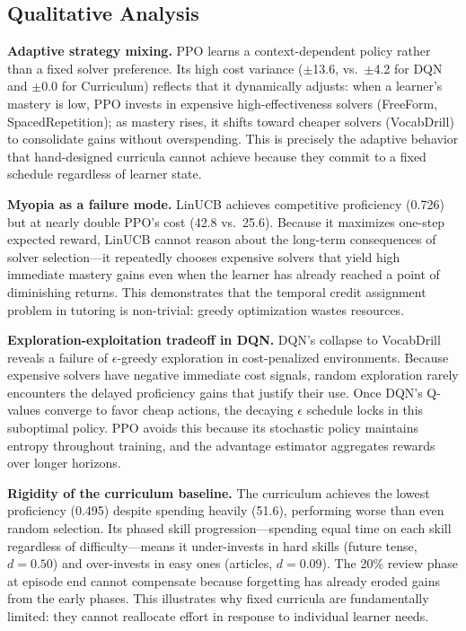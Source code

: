\documentclass{article}
\begin{document}
\subsection{Qualitative Analysis}

\textbf{Adaptive strategy mixing.} PPO learns a context-dependent policy rather than a fixed solver preference. Its high cost variance ($\pm$13.6, vs.\ $\pm$4.2 for DQN and $\pm$0.0 for Curriculum) reflects that it dynamically adjusts: when a learner's mastery is low, PPO invests in expensive high-effectiveness solvers (FreeForm, SpacedRepetition); as mastery rises, it shifts toward cheaper solvers (VocabDrill) to consolidate gains without overspending. This is precisely the adaptive behavior that hand-designed curricula cannot achieve because they commit to a fixed schedule regardless of learner state.

\textbf{Myopia as a failure mode.} LinUCB achieves competitive proficiency (0.726) but at nearly double PPO's cost (42.8 vs.\ 25.6). Because it maximizes one-step expected reward, LinUCB cannot reason about the long-term consequences of solver selection---it repeatedly chooses expensive solvers that yield high immediate mastery gains even when the learner has already reached a point of diminishing returns. This demonstrates that the temporal credit assignment problem in tutoring is non-trivial: greedy optimization wastes resources.

\textbf{Exploration-exploitation tradeoff in DQN.} DQN's collapse to VocabDrill reveals a failure of $\epsilon$-greedy exploration in cost-penalized environments. Because expensive solvers have negative immediate cost signals, random exploration rarely encounters the delayed proficiency gains that justify their use. Once DQN's Q-values converge to favor cheap actions, the decaying $\epsilon$ schedule locks in this suboptimal policy. PPO avoids this because its stochastic policy maintains entropy throughout training, and the advantage estimator aggregates rewards over longer horizons.

\textbf{Rigidity of the curriculum baseline.} The curriculum achieves the lowest proficiency (0.495) despite spending heavily (51.6), performing worse than even random selection. Its phased skill progression---spending equal time on each skill regardless of difficulty---means it under-invests in hard skills (future tense, $d=0.50$) and over-invests in easy ones (articles, $d=0.09$). The 20\% review phase at episode end cannot compensate because forgetting has already eroded gains from the early phases. This illustrates why fixed curricula are fundamentally limited: they cannot reallocate effort in response to individual learner needs.
\end{document}
